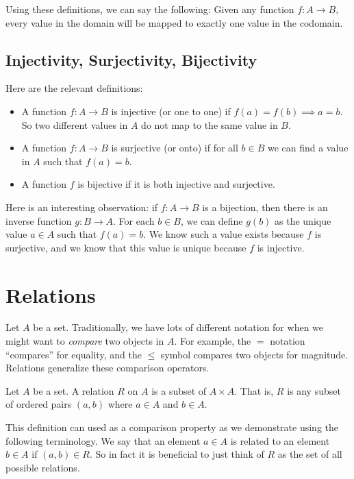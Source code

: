 Using these definitions, we can say the following: Given any function $f:A \to B$, every value in the domain will be mapped to exactly one value in the codomain.

\subsection{Injectivity, Surjectivity, Bijectivity}

Here are the relevant definitions:
\begin{itemize}
    \item A function $f:A \to B$ is injective (or one to one) if $f(a) = f(b) \implies a = b$. So two different values in $A$ do not map to the same value in $B$.
    \item A function $f:A \to B$ is surjective (or onto) if for all $b \in B$ we can find a value in $A$ such that $f(a) = b$.
    \item A function $f$ is bijective if it is both injective and surjective.
\end{itemize}

Here is an interesting observation: if $f: A \to B$ is a bijection, then there is an inverse function $g: B \to A$. For each $b \in B$, we can define $g(b)$ as the unique value $a \in A$ such that $f(a) = b$. We know such a value exists because $f$ is surjective, and we know that this value is unique because $f$ is injective.

\section{Relations}

Let $A$ be a set. Traditionally, we have lots of different notation for when we might want to \textit{compare} two objects in $A$. For example, the $=$ notation ``compares'' for equality, and the $\leq$ symbol compares two objects for magnitude. Relations generalize these comparison operators.

\begin{definition}
Let $A$ be a set. A relation $R$ on $A$ is a subset of $A \times A$. That is, $R$ is any subset of ordered pairs $(a, b)$ where $a \in A$ and $b \in A$.
\end{definition}

This definition can used as a comparison property as we demonstrate using the following terminology. We say that an element $a \in A$ is related to an element $b \in A$ if $(a, b) \in R$. So in fact it is beneficial to just think of $R$ as the set of all possible relations.

